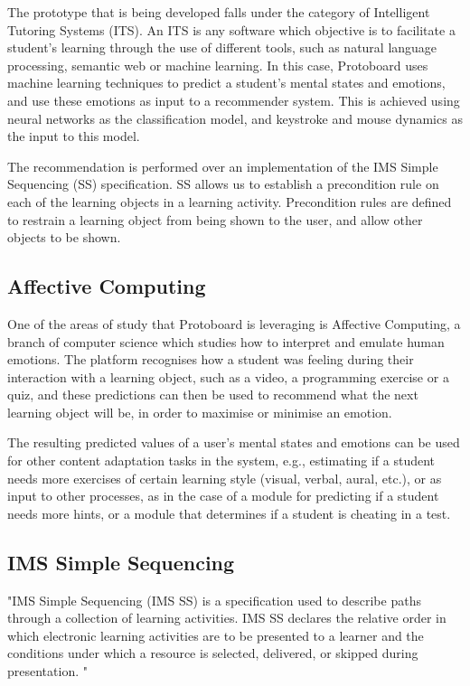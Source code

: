 \documentclass{acm_proc_article-sp}
\begin{document}
The prototype that is being developed falls under the category of
Intelligent Tutoring Systems (ITS). An ITS is any software which
objective is to facilitate a student's learning through the use of
different tools, such as natural language processing, semantic web or
machine learning. In this case, Protoboard uses machine learning
techniques to predict a student's mental states and emotions, and use
these emotions as input to a recommender system. This is achieved
using neural networks as the classification model, and keystroke and
mouse dynamics as the input to this model.

The recommendation is performed over an implementation of the IMS Simple
Sequencing (SS) specification. SS allows us to establish a precondition
rule on each of the learning objects in a learning
activity. Precondition rules are defined to restrain a learning object
from being shown to the user, and allow other objects to be shown.


\subsection{Affective Computing}
One of the areas of study that Protoboard is leveraging is Affective
Computing, a branch of computer science which studies how to interpret
and emulate human emotions. The platform recognises how a student was
feeling during their interaction with a learning object, such as a
video, a programming exercise or a quiz, and these predictions can
then be used to recommend what the next learning object will be, in
order to maximise or minimise an emotion.

The resulting predicted values of a user's mental states and emotions
can be used for other content adaptation tasks in the system, e.g.,
estimating if a student needs more exercises of certain learning style
(visual, verbal, aural, etc.), or as input to other processes, as in
the case of a module for predicting if a student needs more hints, or
a module that determines if a student is cheating in a test.


\subsection{IMS Simple Sequencing}
\label{IMS-SS}

"IMS Simple Sequencing (IMS SS) is a specification used to describe
paths through a collection of learning activities. IMS SS declares
the relative order in which electronic learning activities are to be
presented to a learner and the conditions under which a resource is
selected, delivered, or skipped during
presentation. \cite{bailey2007ims}"
\end{document}
